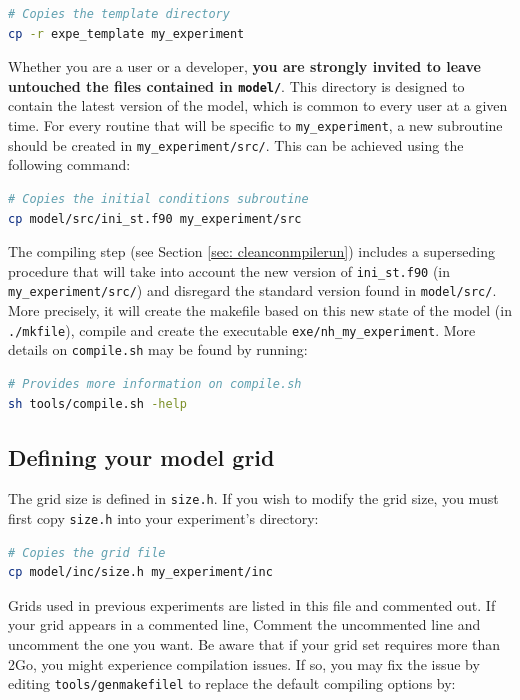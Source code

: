 \documentclass[12pt,letterpaper,titlepage]{article}
\begin{document}
\begin{lstlisting}[language=sh]
# Copies the template directory
cp -r expe_template my_experiment
\end{lstlisting}
Whether you are a user or a developer, \textbf{you are strongly invited to leave untouched the files contained in \texttt{model/}}. This directory is designed to contain the latest version of the model, which is common to every user at a given time. For every routine that will be specific to \texttt{my\_experiment}, a new subroutine should be created in \texttt{my\_experiment/src/}. This can be achieved using the following command:
\begin{lstlisting}[language=sh]
# Copies the initial conditions subroutine
cp model/src/ini_st.f90 my_experiment/src
\end{lstlisting}
The compiling step (see Section \ref{sec: cleanconmpilerun}) includes a superseding procedure that will take into account the new version of \texttt{ini\_st.f90} (in \texttt{my\_experiment/src/}) and disregard the standard version found in \texttt{model/src/}. More precisely, it will create the makefile based on this new state of the model (in \texttt{./mkfile}), compile and create the executable \texttt{exe/nh\_my\_experiment}. More details on \texttt{compile.sh} may be found by running:

\begin{lstlisting}[language=sh]
# Provides more information on compile.sh
sh tools/compile.sh -help
\end{lstlisting}

\subsection{Defining your model grid}

The grid size is defined in \texttt{size.h}. If you wish to modify the grid size, you must first copy \texttt{size.h} into your experiment's directory:

\begin{lstlisting}[language=sh]
# Copies the grid file
cp model/inc/size.h my_experiment/inc
\end{lstlisting}

Grids used in previous experiments are listed in this file and commented out. If your grid appears in a commented line, Comment the uncommented line and uncomment the one you want. Be aware that if your grid set requires more than 2Go, you might experience compilation issues. If so, you may fix the issue by editing \texttt{tools/genmakefilel} to replace the default compiling options by:
\end{document}
